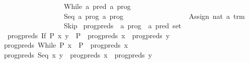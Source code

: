 \begin{isabellebody}
\ \ \ \ \ \ \ \ \ \ \ \ \ \ \ \ \ {}\ While\ {}{}a\ pred{}\ {}{}a\ prog{}\isanewline
\ \ \ \ \ \ \ \ \ \ \ \ \ \ \ \ \ {}\ Seq\ {}{}a\ prog{}\ {}{}a\ prog{}\isanewline
\ \ \ \ \ \ \ \ \ \ \ \ \ \ \ \ \ {}\ Assign\ nat\ {}{}a\ trm{}\isanewline
\ \ \ \ \ \ \ \ \ \ \ \ \ \ \ \ \ {}\ Skip\isanewline
\isanewline
{}\isamarkupfalse%
\ prog{}preds\ {}{}\ {}{}a\ prog\ {}\ {}a\ pred\ set{}\ \isanewline
\ \ {}prog{}preds\ {}If\ P\ x\ y{}\ {}\ {}P{}\ {}\ prog{}preds\ x\ {}\ prog{}preds\ y{}\isanewline
{}\ {}prog{}preds\ {}While\ P\ x{}\ {}\ {}P{}\ {}\ prog{}preds\ x{}\isanewline
{}\ {}prog{}preds\ {}Seq\ x\ y{}\ {}\ prog{}preds\ x\ {}\ prog{}preds\ y{}\isanewline

\end{isabellebody}
